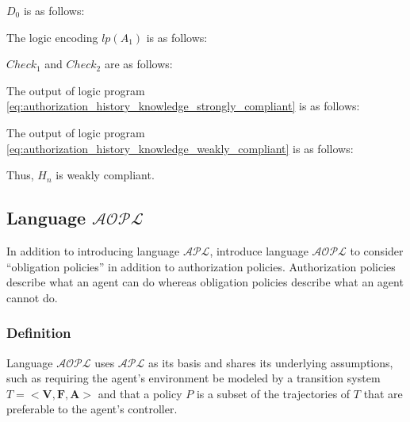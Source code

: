 
$D_0$ is as follows:


The logic encoding $lp(A_1)$ is as follows:


$Check_1$ and $Check_2$ are as follows:



The output of logic program \cref{eq:authorization_history_knowledge_strongly_compliant} is as follows:


The output of logic program \cref{eq:authorization_history_knowledge_weakly_compliant} is as follows:


Thus, $H_n$ is weakly compliant.

\subsection{Language $\mathcal{AOPL}$}

In addition to introducing language $\mathcal{APL}$, \citet{gelfond_authorization_2008} introduce language $\mathcal{AOPL}$ to consider ``obligation policies'' in addition to authorization policies.
Authorization policies describe what an agent can do whereas obligation policies describe what an agent cannot do.

\subsubsection{Definition}

Language $\mathcal{AOPL}$ uses $\mathcal{APL}$ as its basis and shares its underlying assumptions, such as requiring the agent's environment be modeled by a transition system $T=<\boldsymbol{V}, \boldsymbol{F}, \boldsymbol{A}>$ and that a policy $P$ is a subset of the trajectories of $T$ that are preferable to the agent's controller.

